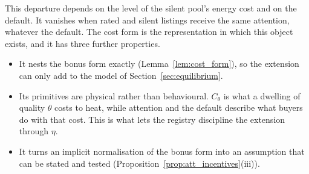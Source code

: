 This departure depends on the level of the silent pool's energy cost and on the default. It vanishes when rated and silent listings receive the same attention, whatever the default. The cost form is the representation in which this object exists, and it has three further properties.
\begin{itemize}
    \item It nests the bonus form exactly (Lemma~\ref{lem:cost_form}), so the extension can only add to the model of Section~\ref{sec:equilibrium}.
    \item Its primitives are physical rather than behavioural. $C_\theta$ is what a dwelling of quality $\theta$ costs to heat, while attention and the default describe what buyers do with that cost. This is what lets the registry discipline the extension through $\eta$.
    \item It turns an implicit normalisation of the bonus form into an assumption that can be stated and tested (Proposition~\ref{prop:att_incentives}(iii)).
\end{itemize}
